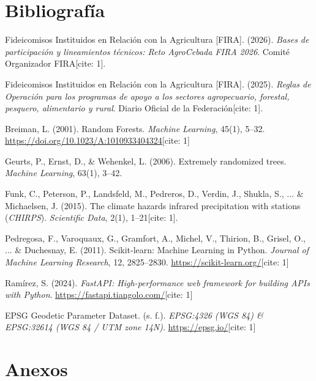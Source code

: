 \documentclass[11pt,a4paper]{article}
\begin{document}
\section{Bibliografía}
\begin{enumerate}[label={\sffamily\bfseries[\arabic*]}, itemsep=3pt]
  \item Fideicomisos Instituidos en Relación con la Agricultura [FIRA]. (2026). \textit{Bases de participación y lineamientos técnicos: Reto AgroCebada FIRA 2026}. Comité Organizador FIRA[cite: 1].
  \item Fideicomisos Instituidos en Relación con la Agricultura [FIRA]. (2025). \textit{Reglas de Operación para los programas de apoyo a los sectores agropecuario, forestal, pesquero, alimentario y rural}. Diario Oficial de la Federación[cite: 1].
  \item Breiman, L. (2001). Random Forests. \textit{Machine Learning}, 45(1), 5--32. \url{https://doi.org/10.1023/A:1010933404324}[cite: 1]
  \item Geurts, P., Ernst, D., \& Wehenkel, L. (2006). Extremely randomized trees. \textit{Machine Learning}, 63(1), 3--42.
  \item Funk, C., Peterson, P., Landsfeld, M., Pedreros, D., Verdin, J., Shukla, S., ... \& Michaelsen, J. (2015). The climate hazards infrared precipitation with stations (\textit{CHIRPS}). \textit{Scientific Data}, 2(1), 1--21[cite: 1].
  \item Pedregosa, F., Varoquaux, G., Gramfort, A., Michel, V., Thirion, B., Grisel, O., ... \& Duchesnay, E. (2011). Scikit-learn: Machine Learning in Python. \textit{Journal of Machine Learning Research}, 12, 2825--2830. \url{https://scikit-learn.org/}[cite: 1]
  \item Ramírez, S. (2024). \textit{FastAPI: High-performance web framework for building APIs with Python}. \url{https://fastapi.tiangolo.com/}[cite: 1]
  \item EPSG Geodetic Parameter Dataset. (s. f.). \textit{EPSG:4326 (WGS 84) \& EPSG:32614 (WGS 84 / UTM zone 14N)}. \url{https://epsg.io/}[cite: 1]
\end{enumerate}

\newpage
\section{Anexos}
\end{document}
